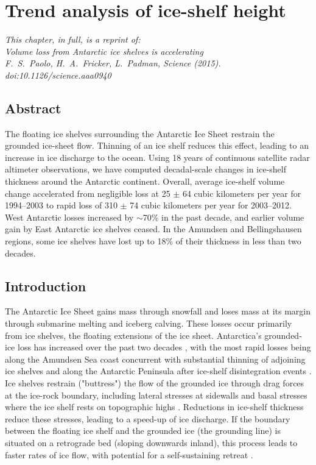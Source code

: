


\chapter{Trend analysis of ice-shelf height}

{\sl
\noindent
This chapter, in full, is a reprint of:\\
Volume loss from Antarctic ice shelves is accelerating\\
 F.~S.~Paolo, H.~A.~Fricker, L.~Padman, {\rm Science} (2015). doi:10.1126/science.aaa0940
}

\section{Abstract}

\noindent
The floating ice shelves surrounding the Antarctic Ice Sheet restrain the
grounded ice-sheet flow. Thinning of an ice shelf reduces this effect, leading
to an increase in ice discharge to the ocean. Using 18 years of continuous
satellite radar altimeter observations, we have computed decadal-scale changes
in ice-shelf thickness around the Antarctic continent. Overall, average
ice-shelf volume change accelerated from negligible loss at 25 $\pm$ 64 cubic
kilometers per year for 1994--2003 to rapid loss of 310 $\pm$ 74 cubic
kilometers per year for 2003--2012. West Antarctic losses increased by
$\sim$70\% in the past decade, and earlier volume gain by East Antarctic ice
shelves ceased. In the Amundsen and Bellingshausen regions, some ice shelves
have lost up to 18\% of their thickness in less than two decades.

\section{Introduction}

\noindent
The Antarctic Ice Sheet gains mass through snowfall and loses
mass at its margin through submarine melting and iceberg calving. These losses
occur primarily from ice shelves, the floating extensions of the ice sheet.
Antarctica's grounded-ice loss has increased over the past two decades
\parencite{Shepherd2012, Sutterley2014}, with the most rapid losses being along
the Amundsen Sea coast \parencite{Joughin2011} concurrent with substantial
thinning of adjoining ice shelves \parencite{Shepherd2010, Pritchard2012} and
along the Antarctic Peninsula after ice-shelf disintegration events \parencite{
Scambos2004}. Ice shelves restrain ("buttress") the flow of the grounded ice
through drag forces at the ice-rock boundary, including lateral stresses at
sidewalls and basal stresses where the ice shelf rests on topographic highs
\parencite{Schoof2007, Goldberg2009}. Reductions in ice-shelf thickness reduce
these stresses, leading to a speed-up of ice discharge. If the boundary between
the floating ice shelf and the grounded ice (the grounding line) is situated on
a retrograde bed (sloping downwards inland), this process leads to faster rates
of ice flow, with potential for a self-sustaining retreat \parencite{
Schoof2007, Favier2014, Joughin2014}.

